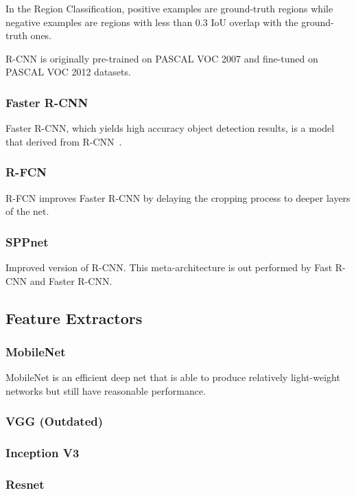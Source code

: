 \documentclass[conference]{IEEEtran}
\begin{document}
In the Region Classification, positive examples are ground-truth regions while negative examples are regions with less than 0.3 IoU overlap with the ground-truth ones.

R-CNN is originally pre-trained on PASCAL VOC 2007 and fine-tuned on PASCAL VOC 2012 datasets. 

\subsubsection{Faster R-CNN}
Faster R-CNN, which yields high accuracy object detection results, is a model that derived from R-CNN~\cite{girshick2015fast}.

\subsubsection{R-FCN}
R-FCN improves Faster R-CNN by delaying the cropping process to deeper layers of the net.

\subsubsection{SPPnet}
Improved version of R-CNN. This meta-architecture is out performed by Fast R-CNN and Faster R-CNN.

\subsection{Feature Extractors}

\subsubsection{MobileNet}
MobileNet is an efficient deep net that is able to produce relatively light-weight networks but still have reasonable performance. ~\cite{howard2017mobilenets}

\subsubsection{VGG (Outdated)}

\subsubsection{Inception V3}

\subsubsection{Resnet}
\end{document}
